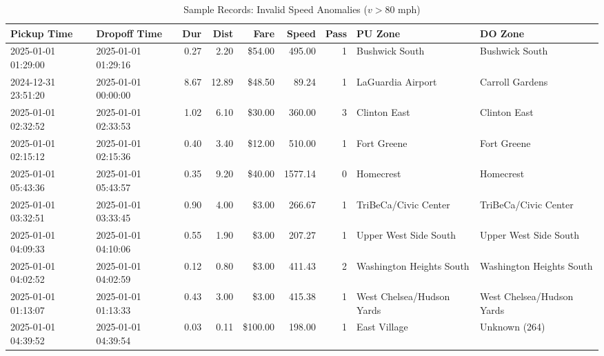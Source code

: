 \documentclass[11pt,a4paper]{article}
\begin{document}
\begin{table}[htbp]
\centering
\caption{Sample Records: Invalid Speed Anomalies ($v > 80$ mph)}
\label{tab:sample_speed}
\tiny
\begin{tabularx}{\textwidth}{l l r r r r r X X}
\toprule
\textbf{Pickup Time} & \textbf{Dropoff Time} & \textbf{Dur} & \textbf{Dist} & \textbf{Fare} & \textbf{Speed} & \textbf{Pass} & \textbf{PU Zone} & \textbf{DO Zone} \\
\midrule
2025-01-01 01:29:00 & 2025-01-01 01:29:16 & 0.27 & 2.20 & \$54.00 & 495.00 & 1 & Bushwick South & Bushwick South \\
2024-12-31 23:51:20 & 2025-01-01 00:00:00 & 8.67 & 12.89 & \$48.50 & 89.24 & 1 & LaGuardia Airport & Carroll Gardens \\
2025-01-01 02:32:52 & 2025-01-01 02:33:53 & 1.02 & 6.10 & \$30.00 & 360.00 & 3 & Clinton East & Clinton East \\
2025-01-01 02:15:12 & 2025-01-01 02:15:36 & 0.40 & 3.40 & \$12.00 & 510.00 & 1 & Fort Greene & Fort Greene \\
2025-01-01 05:43:36 & 2025-01-01 05:43:57 & 0.35 & 9.20 & \$40.00 & 1577.14 & 0 & Homecrest & Homecrest \\
2025-01-01 03:32:51 & 2025-01-01 03:33:45 & 0.90 & 4.00 & \$3.00 & 266.67 & 1 & TriBeCa/Civic Center & TriBeCa/Civic Center \\
2025-01-01 04:09:33 & 2025-01-01 04:10:06 & 0.55 & 1.90 & \$3.00 & 207.27 & 1 & Upper West Side South & Upper West Side South \\
2025-01-01 04:02:52 & 2025-01-01 04:02:59 & 0.12 & 0.80 & \$3.00 & 411.43 & 2 & Washington Heights South & Washington Heights South \\
2025-01-01 01:13:07 & 2025-01-01 01:13:33 & 0.43 & 3.00 & \$3.00 & 415.38 & 1 & West Chelsea/Hudson Yards & West Chelsea/Hudson Yards \\
2025-01-01 04:39:52 & 2025-01-01 04:39:54 & 0.03 & 0.11 & \$100.00 & 198.00 & 1 & East Village & Unknown (264) \\
\bottomrule
\end{tabularx}
\end{table}
\end{document}
